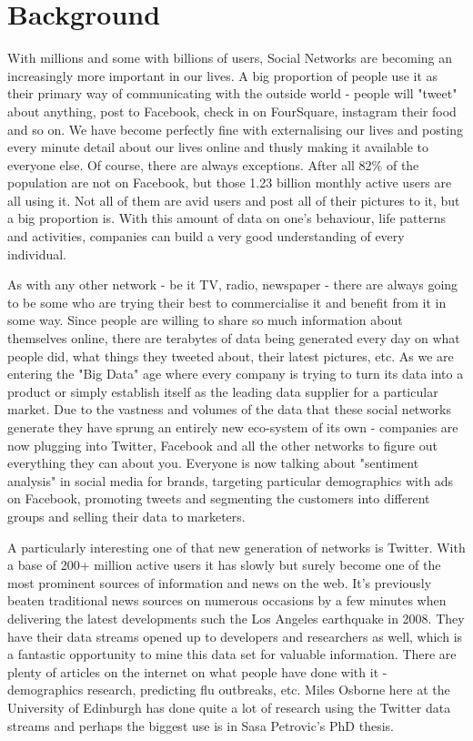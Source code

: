\documentclass[minf,frontabs,twoside,singlespacing,parskip]{infthesis}
\begin{document}
\chapter{Background}


With millions and some with billions of users, Social Networks are becoming an increasingly more important in our lives. A big proportion of people use it as their primary way of communicating with the outside world - people will "tweet" about anything, post to Facebook, check in on FourSquare, instagram their food and so on. We have become perfectly fine with externalising our lives and posting every minute detail about our lives online and thusly making it available to everyone else. 
Of course, there are always exceptions. After all 82\% of the population are not on Facebook, but those 1.23 billion monthly active users are all using it. Not all of them are avid users and post all of their pictures to it, but a big proportion is. With this amount of data on one's behaviour, life patterns and activities, companies can build a very good understanding of every individual. 


As with any other network - be it TV, radio, newspaper - there are always going to be some who are trying their best to commercialise it and benefit from it in some way. Since people are willing to share so much information about themselves online, there are terabytes of data being generated every day on what people did, what things they tweeted about, their latest pictures, etc. As we are entering the "Big Data" age where every company is trying to turn its data into a product or simply establish itself as the leading data supplier for a particular market. Due to the vastness and volumes of the data that these social networks generate they have sprung an entirely new eco-system of its own - companies are now plugging into Twitter, Facebook and all the other networks to figure out everything they can about you. Everyone is now talking about "sentiment analysis" in social media for brands, targeting particular demographics with ads on Facebook, promoting tweets and segmenting the customers into different groups and selling their data to marketers.


A particularly interesting one of that new generation of networks is Twitter. With a base of 200+ million active users it has slowly but surely become one of the most prominent sources of information and news on the web. It's previously beaten traditional news sources on numerous occasions by a few minutes when delivering the latest developments such the Los Angeles earthquake in 2008. \cite{TwitterNewsWire} They have their data streams opened up to developers and researchers as well, which is a fantastic opportunity to mine this data set for valuable information. There are plenty of articles on the internet on what people have done with it - demographics research, predicting flu outbreaks, etc. \cite{TwitterResearch} Miles Osborne here at the University of Edinburgh has done quite a lot of research using the Twitter data streams  \cite{Miles} and perhaps the biggest use is in Sasa Petrovic's PhD thesis. \cite{Petrovic2012}
\end{document}
